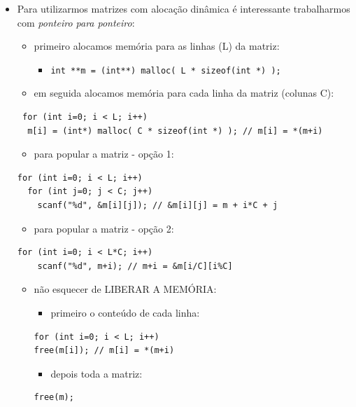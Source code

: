 \documentclass[12pt,a4paper]{article}
\providecommand{\tightlist}{%
      \setlength{\itemsep}{0pt}\setlength{\parskip}{0pt}}
\begin{document}
    \begin{itemize}
\tightlist
\item
  Para utilizarmos matrizes com alocação dinâmica é interessante
  trabalharmos com \emph{ponteiro para ponteiro}:

  \begin{itemize}
  \tightlist
  \item
    primeiro alocamos memória para as linhas (L) da matriz:

    \begin{itemize}
    \tightlist
    \item
      \texttt{int\ **m\ =\ (int**)\ malloc(\ L\ *\ sizeof(int\ *)\ );}
    \end{itemize}
  \item
    em seguida alocamos memória para cada linha da matriz (colunas C):
  \end{itemize}

\begin{verbatim}
 for (int i=0; i < L; i++)
  m[i] = (int*) malloc( C * sizeof(int *) ); // m[i] = *(m+i)
\end{verbatim}

  \begin{itemize}
  \tightlist
  \item
    para popular a matriz - opção 1:
  \end{itemize}

\begin{verbatim}
for (int i=0; i < L; i++)
  for (int j=0; j < C; j++)
    scanf("%d", &m[i][j]); // &m[i][j] = m + i*C + j
\end{verbatim}

  \begin{itemize}
  \tightlist
  \item
    para popular a matriz - opção 2:
  \end{itemize}

\begin{verbatim}
for (int i=0; i < L*C; i++)
    scanf("%d", m+i); // m+i = &m[i/C][i%C]
\end{verbatim}

  \begin{itemize}
  \tightlist
  \item
    não esquecer de LIBERAR A MEMÓRIA:

    \begin{itemize}
    \tightlist
    \item
      primeiro o conteúdo de cada linha:
    \end{itemize}

\begin{verbatim}
for (int i=0; i < L; i++)
free(m[i]); // m[i] = *(m+i)
\end{verbatim}

    \begin{itemize}
    \tightlist
    \item
      depois toda a matriz:
    \end{itemize}

\begin{verbatim}
free(m);
\end{verbatim}
  \end{itemize}
\end{itemize}
\end{document}
